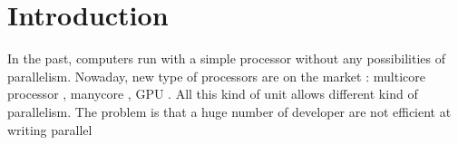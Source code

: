 \chapter{Introduction}\label{ch:Intro}

In the past, computers run with a simple processor without any possibilities of parallelism. Nowaday, new type of processors are on the market : multicore processor , manycore , GPU . All this kind of unit allows different kind of parallelism. The problem is that a huge number of developer are not efficient at writing parallel



